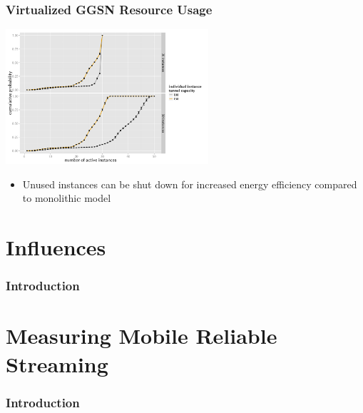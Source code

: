 \documentclass{beamer}
\begin{document}
\begin{frame}
	\frametitle{Virtualized GGSN Resource Usage}

	\begin{center}
		\includegraphics[height=5cm]{../../chapters/04-mobilenets/images/R-virtualized-instanceuse.pdf}
	\end{center}

	\begin{itemize}
		\item Unused instances can be shut down for increased energy efficiency compared to monolithic model
	\end{itemize}
\end{frame}



\section{Influences}

\begin{frame}
	\frametitle{Introduction}
\end{frame}






\section{Measuring Mobile Reliable Streaming}

\begin{frame}
	\frametitle{Introduction}
\end{frame}





\end{document}
